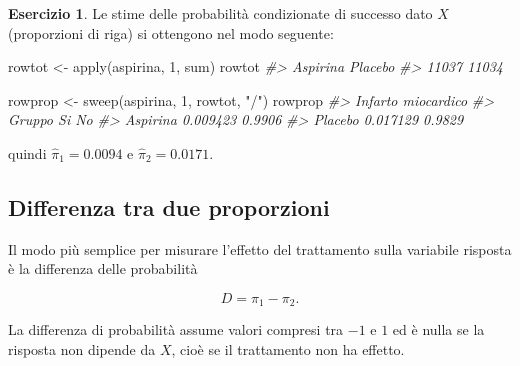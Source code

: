 \documentclass[
  11pt,
]{krantz}
\makeatletter
\newenvironment{Shaded}{\begin{snugshade}}{\end{snugshade}}
\newcommand{\CommentTok}[1]{\textcolor[rgb]{0.37,0.37,0.37}{\textit{#1}}}
\newcommand{\DecValTok}[1]{\textcolor[rgb]{0.06,0.06,0.06}{#1}}
\newcommand{\FunctionTok}[1]{\textcolor[rgb]{0,0,0}{#1}}
\newcommand{\NormalTok}[1]{#1}
\newcommand{\OtherTok}[1]{\textcolor[rgb]{0.37,0.37,0.37}{#1}}
\newcommand{\StringTok}[1]{\textcolor[rgb]{0.5,0.5,0.5}{#1}}
\newenvironment{kframe}{%
\medskip{}
\setlength{\fboxsep}{.8em}
 \def\at@end@of@kframe{}%
 \ifinner\ifhmode%
  \def\at@end@of@kframe{\end{minipage}}%
  \begin{minipage}{\columnwidth}%
 \fi\fi%
 \def\FrameCommand##1{\hskip\@totalleftmargin \hskip-\fboxsep
 \colorbox{shadecolor}{##1}\hskip-\fboxsep
     \hskip-\linewidth \hskip-\@totalleftmargin \hskip\columnwidth}%
 \MakeFramed {\advance\hsize-\width
   \@totalleftmargin\z@ \linewidth\hsize
   \@setminipage}}%
 {\par\unskip\endMakeFramed%
 \at@end@of@kframe}
\renewenvironment{Shaded}{\begin{kframe}}{\end{kframe}}
\theoremstyle{definition}
\theoremstyle{definition}
\theoremstyle{definition}
\newtheorem{exercise}{Esercizio}[chapter]
\theoremstyle{definition}
\theoremstyle{remark}
\makeatother
\begin{document}
\begin{exercise}
Le stime delle probabilità condizionate di successo dato \(X\) (proporzioni di riga) si ottengono nel modo seguente:

\begin{Shaded}
\begin{Highlighting}[]
\NormalTok{rowtot }\OtherTok{\textless{}{-}} \FunctionTok{apply}\NormalTok{(aspirina, }\DecValTok{1}\NormalTok{, sum)}
\NormalTok{rowtot}
\CommentTok{\#\textgreater{} Aspirina  Placebo }
\CommentTok{\#\textgreater{}    11037    11034}
\end{Highlighting}
\end{Shaded}

\begin{Shaded}
\begin{Highlighting}[]
\NormalTok{rowprop }\OtherTok{\textless{}{-}} \FunctionTok{sweep}\NormalTok{(aspirina, }\DecValTok{1}\NormalTok{, rowtot, }\StringTok{"/"}\NormalTok{)}
\NormalTok{rowprop}
\CommentTok{\#\textgreater{}           Infarto miocardico}
\CommentTok{\#\textgreater{} Gruppo           Si     No}
\CommentTok{\#\textgreater{}   Aspirina 0.009423 0.9906}
\CommentTok{\#\textgreater{}   Placebo  0.017129 0.9829}
\end{Highlighting}
\end{Shaded}

quindi \(\hat{\pi}_1=0.0094\) e \(\hat{\pi}_2=0.0171\).
\end{exercise}

\hypertarget{differenza-tra-due-proporzioni}{%
\subsection{Differenza tra due proporzioni}\label{differenza-tra-due-proporzioni}}

Il modo più semplice per misurare l'effetto del trattamento sulla variabile risposta è la differenza delle probabilità

\[
D =\pi_1 - \pi_2.
\]

La differenza di probabilità assume valori compresi tra \(-1\) e \(1\) ed è nulla se la risposta non dipende da \(X\), cioè se il trattamento non ha effetto.
\end{document}
